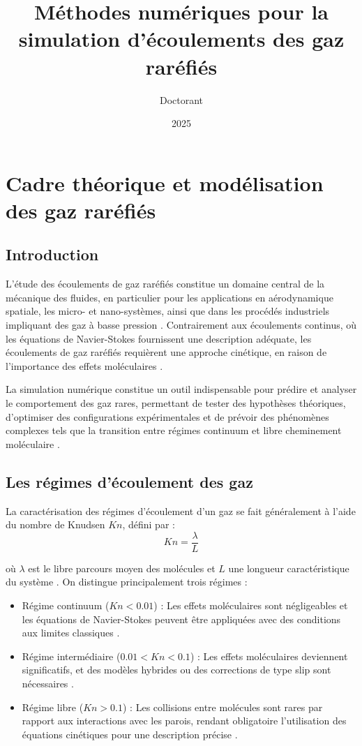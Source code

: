 \documentclass[12pt,a4paper]{report}
\title{Méthodes numériques pour la simulation d'écoulements des gaz raréfiés}
\author{Doctorant}
\date{2025}
\begin{document}
	\maketitle
	
	\chapter{Cadre théorique et modélisation des gaz raréfiés}
	
	\section{Introduction}
	L’étude des écoulements de gaz raréfiés constitue un domaine central de la mécanique des fluides, en particulier pour les applications en aérodynamique spatiale, les micro- et nano-systèmes, ainsi que dans les procédés industriels impliquant des gaz à basse pression \cite{cercignani1988, sone2007}. Contrairement aux écoulements continus, où les équations de Navier-Stokes fournissent une description adéquate, les écoulements de gaz raréfiés requièrent une approche cinétique, en raison de l’importance des effets moléculaires \cite{chapman1970, bird1994}.
	
	La simulation numérique constitue un outil indispensable pour prédire et analyser le comportement des gaz rares, permettant de tester des hypothèses théoriques, d’optimiser des configurations expérimentales et de prévoir des phénomènes complexes tels que la transition entre régimes continuum et libre cheminement moléculaire \cite{garcia1999, boyd1995}.
	
	\section{Les régimes d’écoulement des gaz}
	
	La caractérisation des régimes d’écoulement d’un gaz se fait généralement à l’aide du nombre de Knudsen $Kn$, défini par :
	\begin{equation}
		Kn = \frac{\lambda}{L}
	\end{equation}
	
	où $\lambda$ est le libre parcours moyen des molécules et $L$ une longueur caractéristique du système \cite{cercignani1988, karniadakis2005}. On distingue principalement trois régimes :
	
	\begin{itemize}
		\item Régime continuum ($Kn < 0.01$) : Les effets moléculaires sont négligeables et les équations de Navier-Stokes peuvent être appliquées avec des conditions aux limites classiques \cite{cercignani1988}.
		\item Régime intermédiaire ($0.01 < Kn < 0.1$) : Les effets moléculaires deviennent significatifs, et des modèles hybrides ou des corrections de type slip sont nécessaires \cite{karniadakis2005, hadjiconstantinou2003}.
		\item Régime libre ($Kn > 0.1$) : Les collisions entre molécules sont rares par rapport aux interactions avec les parois, rendant obligatoire l’utilisation des équations cinétiques pour une description précise \cite{sone2007, garcia1999}.
	\end{itemize}
	
\end{document}
